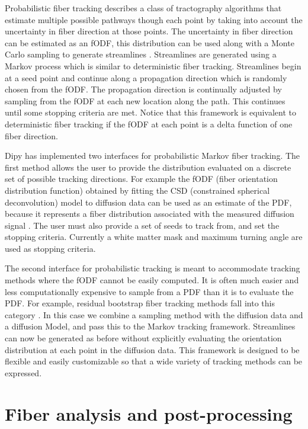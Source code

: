 \documentclass{bioinfo}
\begin{document}
Probabilistic fiber tracking describes a class of tractography algorithms that
estimate multiple possible pathways though each point by taking into
account the uncertainty in fiber direction at those points. The uncertainty in
fiber direction can be estimated as an fODF, this distribution can be used along with a Monte Carlo sampling to
generate streamlines \citep{morris2008probabilistic}. Streamlines are generated using a
Markov process which is similar to deterministic fiber tracking. Streamlines begin
at a seed point and continue along a propagation direction which is randomly
chosen from the fODF. The propagation direction is continually adjusted by
sampling from the fODF at each new location along the path. This continues until
some stopping criteria are met. Notice that this framework is equivalent to
deterministic fiber tracking if the fODF at each point is a delta function of
one fiber direction.

Dipy has implemented two interfaces for probabilistic Markov fiber tracking. The
first method allows the user to provide the distribution evaluated on a discrete set of possible tracking directions. For example the fODF (fiber orientation distribution function)
obtained by fitting the CSD (constrained spherical deconvolution) model to diffusion
data can be used as an estimate of the PDF, because it represents a fiber distribution
associated with the measured diffusion signal \citep{jeurissen2011probabilistic}. The user must
also provide a set of seeds to track from, and set the stopping criteria. Currently a white matter mask and maximum turning angle are used as stopping criteria.

The second interface for probabilistic tracking is meant to accommodate tracking
methods where the fODF cannot be easily computed. It is often much easier and less
computationally expensive to sample from a PDF than it is to evaluate the PDF. For
example, residual bootstrap fiber tracking methods fall into this category \citep{berman2008probabilistic}.
In this case we combine a sampling method with the diffusion data and a diffusion Model,
and pass this to the Markov tracking framework. Streamlines can now be generated
as before without explicitly evaluating the orientation distribution at each
point in the diffusion data. This framework is designed to be flexible and easily
customizable so that a wide variety of tracking methods can be expressed.

\section{Fiber analysis and post-processing}\label{post_tracking}
\end{document}
